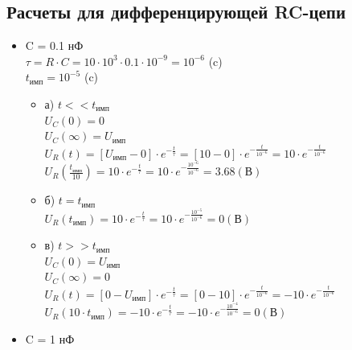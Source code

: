 \subsection{Расчеты для дифференцирующей RC-цепи}
\begin{itemize}
\item C = 0.1 нФ\\

		$\tau = R \cdot C = 10 \cdot 10^3 \cdot 0.1 \cdot 10^{-9} = 10^{-6}$ (c)\\
		$t_\text{имп} = 10^{-5}$ (c)\\

\begin{itemize}
\item[] а) $t << t_\text{имп}$\\

		$U_C(0)	= 0$\\
		$U_C(\infty) = U_\text{имп}$\\
		
		$U_R(t) = [U_\text{имп} - 0] \cdot e^{-\frac{t}{\tau}} = [10 - 0] \cdot e^{-\frac{t}{10^{-6}}} = 10 \cdot e^{-\frac{t}{10^{-6}}}$\\


		$U_R(\frac{t_\text{имп}}{10}) = 10 \cdot e^{-\frac{t}{\tau}} = 10 \cdot e^{-\frac{10^{-6}}{10^{-6}}} = 3.68 (\text{В})$\\

\item[] б) $t = t_\text{имп}$\\
		$U_R(t_\text{имп}) = 10 \cdot e^{-\frac{t}{\tau}} = 10 \cdot e^{-\frac{10^{-5}}{10^{-6}}} = 0 (\text{В})$\\
	
\item[] в) $t >> t_\text{имп}$\\
		
		$U_C(0)	= U_\text{имп}$\\
		$U_C(\infty) = 0$\\		
		
		$U_R(t) = [0 - U_\text{имп}] \cdot e^{-\frac{t}{\tau}} = [0 - 10] \cdot e^{-\frac{t}{10^{-6}}} = -10 \cdot e^{-\frac{t}{10^{-6}}}$\\

		$U_R(10 \cdot t_\text{имп}) = -10 \cdot e^{-\frac{t}{\tau}} = -10 \cdot e^{-\frac{10^{-4}}{10^{-6}}} = 0 (\text{В})$\\

\end{itemize}

\item C = 1 нФ\\


\end{itemize}
